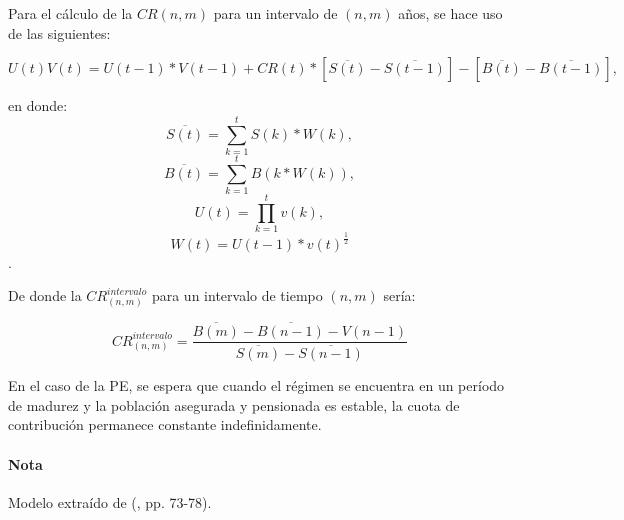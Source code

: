 \documentclass[12pt,letterpaper,titlepage]{article}
\begin{document}
{Para el cálculo de la $CR(n,m)$ para un intervalo de $(n,m)$ años, se hace uso de las siguientes:

\[ U(t)V(t)=U(t-1)*V(t-1)+CR(t)*\left[\overline{S(t)}-\overline{S(t-1)}\right]-\left[\overline{B(t)}-\overline{B(t-1)} \right]   ,\]

en donde:
\[ \overline{S(t)}=\sum\limits_{k=1}^{t}S(k)*W(k), \]
\[ \overline{B(t)}=\sum\limits_{k=1}^{t}B(k*W(k)) ,\]
\[ U(t)=\prod\limits_{k=1}^{t}v(k), \]
\[ W(t)=U(t-1)*v(t)^{\frac{1}{2}} \].

De donde la $CR^{intervalo}_{(n,m)}$ para un intervalo de tiempo $(n,m)$ sería:

\[CR^{intervalo}_{(n,m) }=\dfrac{\overline{B(m)}-\overline{B(n-1)}-V(n-1)}{\overline{S(m)}-\overline{S(n-1)}}\]

En el caso de la PE, se espera que cuando el régimen se encuentra en un período de madurez y la población asegurada y pensionada es estable, la cuota de contribución permanece constante indefinidamente.

\paragraph{Nota}Modelo extraído de (\cite{amssp}, pp. 73-78).


\newpage



\label{fin}


\par}
\end{document}
